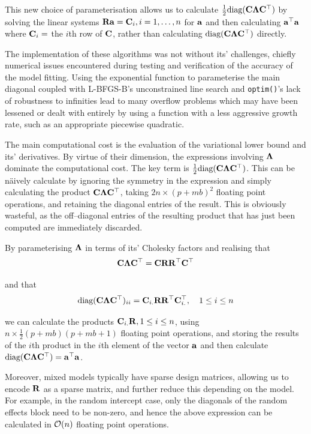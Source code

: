 \noindent This new choice of parameterisation allows us to calculate $\frac{1}{2} \text{diag}({\bf C} {\boldsymbol \Lambda}
{\bf C}^\top)$ by solving the linear systems ${\bf R} {\bf a} = {\bf C}_{i}, i=1, \ldots, n$ for   ${\bf a}$ and then calculating
${\bf a}^\top{\bf a}$ where ${\bf C}_{i} = $ the $i$th row of ${\bf C}$, rather than calculating $\text{diag}({\bf C} {\boldsymbol \Lambda}
{\bf C}^\top)$ directly.
	
The implementation of these algorithms was not without its' challenges, chiefly numerical issues encountered during testing and verification of the accuracy of the model fitting. Using the exponential function to parameterise the main diagonal coupled with L-BFGS-B's unconstrained line search and \texttt{optim()}'s lack of robustness to infinities lead to many overflow problems which may have been lessened or dealt with entirely by using a function with a less aggressive growth rate, such as an appropriate piecewise quadratic.
	
The main computational cost is the evaluation of the variational lower bound and its' derivatives. By
virtue of their dimension, the expressions involving ${\boldsymbol \Lambda}$ dominate the computational cost. The key
term is $\frac{1}{2} \text{diag}({\bf C} {\boldsymbol \Lambda} {\bf C}^\top)$. This can be n\"aively calculate by ignoring the
symmetry in the expression and simply calculating the product ${\bf C} {\boldsymbol \Lambda} {\bf C}^\top$, taking $2 n
\times (p + m b)^2$ floating point operations, and retaining the diagonal entries of the result. This is
obviously wasteful, as the off--diagonal entries of the resulting product that has just been computed
are immediately discarded.
	
By parameterising ${\boldsymbol \Lambda}$ in terms of its' Cholesky factors and realising that
\begin{equation*}
	{\bf C} {\boldsymbol\Lambda} {\bf C}^\top = {\bf C} {\bf R} {\bf R}^\top {\bf C}^\top
\end{equation*}
	
\noindent and that
\begin{equation*}
	\text{diag}({\bf C} {\boldsymbol \Lambda} {\bf C}^\top)_{ii} = {\bf C}_{i .} {\bf R} {\bf R}^\top {\bf C}_{i .}^\top,\quad1 \leq i \leq n
\end{equation*}
	
\noindent we can calculate the products ${\bf C}_{i .} {\bf R}, 1 \leq i \leq n$, using $n \times \frac{1}{2}(p + m
b)(p + m b   + 1)$ floating point operations, and storing the results of the $i$th product in the $i$th
element of the   vector ${\bf a}$ and then calculate $\text{diag}({\bf C} {\boldsymbol \Lambda} {\bf C}^\top) = {\bf a}^\top {\bf a}$.
	
Moreover, mixed models typically have sparse design matrices, allowing us to encode ${\bf R}$ as a sparse matrix, and	further reduce   this depending on the model. For example, in the random intercept case, only the diagonals of the random effects block need to be non-zero, and hence the above expression can be calculated in
$\mathcal{O}(n)$ floating point operations.
	
